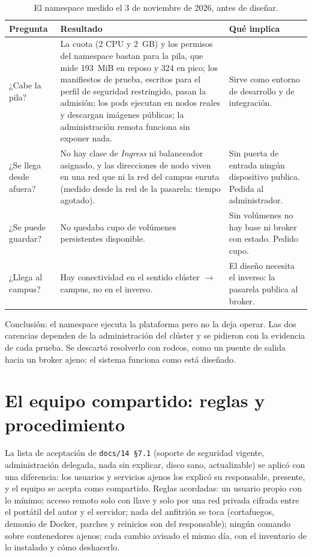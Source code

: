 \begin{table}[H]
\centering\footnotesize
\begin{tablaseg}
\begin{tabular}{@{}L{2.6cm}L{6.4cm}L{4cm}@{}}
\toprule
\textbf{Pregunta} & \textbf{Resultado} & \textbf{Qué implica} \\
\midrule
¿Cabe la pila? & La cuota (2 CPU y 2~GB) y los permisos del namespace bastan para la pila, que mide 193~MiB en reposo y 324 en pico; los manifiestos de prueba, escritos para el perfil de seguridad restringido, pasan la admisión; los pods ejecutan en nodos reales y descargan imágenes públicas; la administración remota funciona sin exponer nada. & Sirve como entorno de desarrollo y de integración. \\
¿Se llega desde afuera? & No hay clase de \emph{Ingress} ni balanceador asignado, y las direcciones de nodo viven en una red que ni la red del campus enruta (medido desde la red de la pasarela: tiempo agotado). & Sin puerta de entrada ningún dispositivo publica. Pedida al administrador. \\
¿Se puede guardar? & No quedaba cupo de volúmenes persistentes disponible. & Sin volúmenes no hay base ni broker con estado. Pedido cupo. \\
¿Llega al campus? & Hay conectividad en el sentido clúster $\rightarrow$ campus, no en el inverso. & El diseño necesita el inverso: la pasarela publica al broker. \\
\bottomrule
\end{tabular}
\end{tablaseg}
\caption[El namespace medido antes de diseñar]{El namespace medido el 3 de noviembre de 2026, antes de diseñar.}
\label{tab:namespace}
\end{table}

Conclusión: el namespace ejecuta la plataforma pero no la deja operar. Las dos carencias dependen de la administración del clúster y se pidieron con la evidencia de cada prueba. Se descartó resolverlo con rodeos, como un puente de salida hacia un broker ajeno: el sistema funciona como está diseñado.

\section{El equipo compartido: reglas y procedimiento}

La lista de aceptación de \texttt{docs/14 §7.1} (soporte de seguridad vigente, administración delegada, nada sin explicar, disco sano,
actualizable) se aplicó con una diferencia: los usuarios y servicios ajenos los explicó su responsable, presente, y el equipo se acepta como
compartido. Reglas acordadas: un usuario propio con lo mínimo; acceso remoto solo con llave y solo por una red privada cifrada entre el portátil
del autor y el servidor; nada del anfitrión se toca (cortafuegos, demonio de Docker, parches y reinicios son del responsable); ningún comando
sobre contenedores ajenos; cada cambio avisado el mismo día, con el inventario de lo instalado y cómo deshacerlo.

